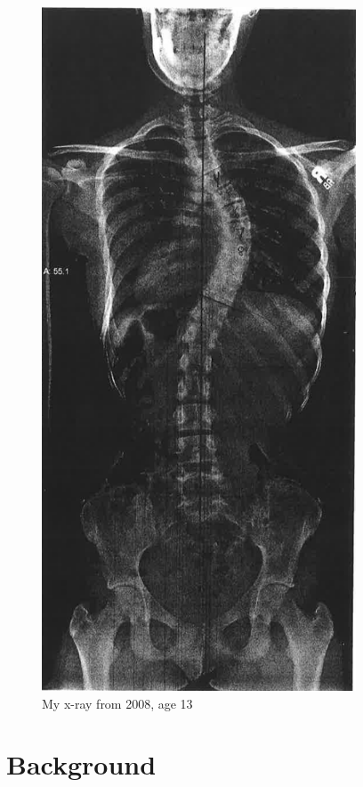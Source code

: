 \documentclass[12pt]{report}
\begin{document}
\begin{figure}[H]
    \caption{My x-ray from 2008, age 13}
\label{Figure 1}
    \includegraphics[height=8in]{xray.png}
    \centering
\end{figure}


\chapter{Background}
\end{document}
